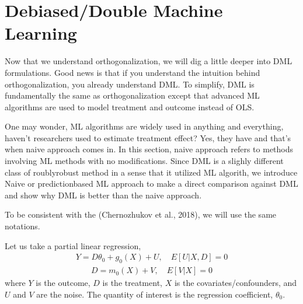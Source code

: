 \documentclass[letterpaper,10pt,english]{jupyterBook}
\begin{document}
\section{Debiased/Double Machine Learning}
\label{\detokenize{orthogonal_DML:debiased-double-machine-learning}}
\sphinxAtStartPar
Now that we understand orthogonalization, we will dig a little deeper into DML formulations. Good news is that if you understand the intuition behind orthogonalization, you already understand DML. To simplify, DML is fundamentally the same as orthogonalization except that advanced ML algorithms are used to model treatment and outcome instead of OLS.

\sphinxAtStartPar
One may wonder, ML algorithms are widely used in anything and everything, haven’t researchers used to estimate treatment effect? Yes, they have and that’s when naive approach comes in. In this section, naive approach refers to methods involving ML methods with no modifications. Since DML is a slighly different class of roubly\sphinxhyphen{}robust method in a sense that it utilized ML algorith, we introduce Naive or prediction\sphinxhyphen{}based ML approach to make a direct comparison against DML and show why DML is better than the naive approach.

\sphinxAtStartPar
To be consistent with the (Chernozhukov et al., 2018), we will use the same notations.

\sphinxAtStartPar
Let us take a partial linear regression,
\begin{equation*}
\begin{split}Y = D\theta_0 + g_0(X) + U, \quad E[U|X, D] = 0 \end{split}
\end{equation*}\begin{equation*}
\begin{split}D = m_0(X) + V, \quad E[V|X] = 0\end{split}
\end{equation*}
\sphinxAtStartPar
where \(Y\) is the outcome, \(D\) is the treatment, \(X\) is the covariates/confounders, and \(U\) and \(V\) are the noise. The quantity of interest is the regression coefficient, \(\theta_0\).
\end{document}
